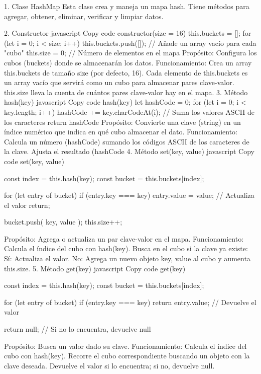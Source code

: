 1. Clase HashMap
Esta clase crea y maneja un mapa hash. Tiene métodos para agregar, obtener, eliminar, verificar y limpiar datos.

2. Constructor
javascript
Copy code
constructor(size = 16) {
  this.buckets = [];
  for (let i = 0; i < size; i++) {
    this.buckets.push([]); // Añade un array vacío para cada "cubo"
  }
  this.size = 0; // Número de elementos en el mapa
}
Propósito: Configura los cubos (buckets) donde se almacenarán los datos.
Funcionamiento:
Crea un array this.buckets de tamaño size (por defecto, 16).
Cada elemento de this.buckets es un array vacío que servirá como un cubo para almacenar pares clave-valor.
this.size lleva la cuenta de cuántos pares clave-valor hay en el mapa.
3. Método hash(key)
javascript
Copy code
hash(key) {
  let hashCode = 0;
  for (let i = 0; i < key.length; i++) {
    hashCode += key.charCodeAt(i); // Suma los valores ASCII de los caracteres
  }
  return hashCode %
}
Propósito: Convierte una clave (string) en un índice numérico que indica en qué cubo almacenar el dato.
Funcionamiento:
Calcula un número (hashCode) sumando los códigos ASCII de los caracteres de la clave.
Ajusta el resultado (hashCode %
4. Método set(key, value)
javascript
Copy code
set(key, value) {
  const index = this.hash(key);
  const bucket = this.buckets[index];

  for (let entry of bucket) {
    if (entry.key === key) {
      entry.value = value; // Actualiza el valor
      return;
    }
  }

  bucket.push({ key, value });
  this.size++;
}
Propósito: Agrega o actualiza un par clave-valor en el mapa.
Funcionamiento:
Calcula el índice del cubo con hash(key).
Busca en el cubo si la clave ya existe:
Sí: Actualiza el valor.
No: Agrega un nuevo objeto { key, value } al cubo y aumenta this.size.
5. Método get(key)
javascript
Copy code
get(key) {
  const index = this.hash(key);
  const bucket = this.buckets[index];

  for (let entry of bucket) {
    if (entry.key === key) {
      return entry.value; // Devuelve el valor
    }
  }

  return null; // Si no lo encuentra, devuelve null
}
Propósito: Busca un valor dado su clave.
Funcionamiento:
Calcula el índice del cubo con hash(key).
Recorre el cubo correspondiente buscando un objeto con la clave deseada.
Devuelve el valor si lo encuentra; si no, devuelve null.
